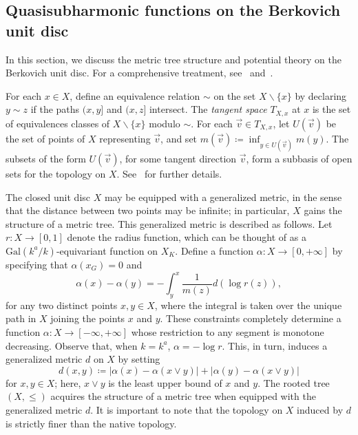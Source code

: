 \documentclass[10pt,reqno]{amsart}
\theoremstyle{plain}
\theoremstyle{definition}
\numberwithin{equation}{section}
\newcommand{\Gal}{\textrm{Gal}}
\begin{document}
\subsection{Quasisubharmonic functions on the Berkovich unit disc}\label{section:quasisubharmonic} 
In this section, we discuss the metric tree structure and potential theory on the Berkovich unit disc. For a comprehensive treatment, see~\cite{baker-rumely} and~\cite{dynberko}.

For each $x \in X$, define an equivalence relation $\sim$ on the set $X \backslash \{ x \}$ by declaring $y \sim z$ if the paths $(x,y]$ and $(x,z]$ intersect. The \emph{tangent space} $T_{X,x}$ at $x$ is the set of equivalences classes of $X \backslash \{ x \}$ modulo $\sim$.
For each $\vec{v} \in T_{X,x}$, let $U(\vec{v})$ be the set of points of $X$ representing $\vec{v}$, and set $m(\vec{v}) \coloneqq \inf_{y \in U(\vec{v})} m(y)$. 
The subsets of the form $U(\vec{v})$, for some tangent direction $\vec{v}$, form a subbasis of open sets for the topology on $X$. See~\cite[\S2.3]{dynberko} for further details.

The closed unit disc $X$ may be equipped with a generalized metric, in the sense that the distance between two points may be infinite; in particular, $X$ gains the structure of a metric tree. This generalized metric is described as follows.  Let $r \colon X \to [0,1]$ denote the radius function, which can be thought of as a $\Gal(k^a/k)$-equivariant function on $X_{K}$.
Define a function $\alpha \colon X \to [0,+\infty]$ by specifying that $\alpha(x_G) = 0$ and 
\begin{equation}\label{definition of alpha}
\alpha(x) - \alpha(y) = -\int_y^x \frac{1}{m(z)} d \left( \log r(z) \right),
\end{equation}
for any two distinct points $x,y \in X$, where the integral is taken over the unique path in $X$ joining the points $x$ and $y$. 
These constraints completely determine a function $\alpha \colon X \to [-\infty, + \infty]$ whose restriction to any segment is monotone decreasing. Observe that, when $k = k^a$, $\alpha = -\log r$. This, in turn, induces a generalized metric $d$ on $X$ by setting
$$
d(x,y) \coloneqq |\alpha(x) - \alpha(x \vee y)| + |\alpha(y) - \alpha(x \vee y)|
$$
for $x, y \in X$; here, $x \vee y$ is the least upper bound of $x$ and $y$.
The rooted tree $(X,\leq )$ acquires the structure of a metric tree
when equipped with the generalized metric $d$. It is important to note that the topology on $X$ induced by $d$ is strictly finer than the native topology.
\end{document}
